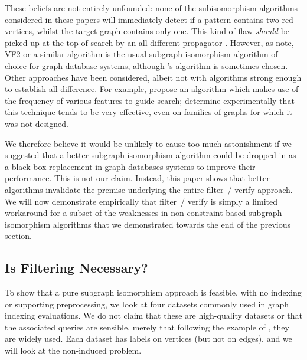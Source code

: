 \documentclass[twoside,11pt]{article}
\begin{document}
These beliefs are not entirely unfounded: none of the subisomorphism algorithms considered in these
papers will immediately detect if a pattern contains two red vertices, whilst the target graph
contains only one. This kind of flaw \emph{should} be picked up at the top of search by an
all-different propagator \cite{DBLP:conf/aaai/Regin94}.  However, as
 note, VF2 \cite{DBLP:journals/pami/CordellaFSV04} or a
similar algorithm is the usual subgraph isomorphism algorithm of choice for graph database systems,
although \citeauthor{DBLP:journals/jacm/Ullmann76}'s algorithm is sometimes chosen. Other approaches
have been considered, albeit not with algorithms strong enough to establish all-difference. For
example,  propose an algorithm which makes use of the
frequency of various features to guide search;  determine
experimentally that this technique tends to be very effective, even on families of graphs for which
it was not designed.

We therefore believe it would be unlikely to cause too much astonishment if we suggested that a
better subgraph isomorphism algorithm could be dropped in as a black box replacement in graph
databases systems to improve their performance.  This is not our claim. Instead, this paper shows
that better algorithms invalidate the premise underlying the entire filter~/ verify approach.  We
will now demonstrate empirically that filter~/ verify is simply a limited workaround for a subset of
the weaknesses in non-constraint-based subgraph isomorphism algorithms that we demonstrated towards
the end of the previous section.

\subsection{Is Filtering Necessary?}

To show that a pure subgraph isomorphism approach is feasible, with no indexing or supporting
preprocessing, we look at four datasets commonly used in graph indexing evaluations. We do not claim
that these are high-quality datasets or that the associated queries are sensible, merely that
following the example of , they are widely used. Each dataset
has labels on vertices (but not on edges), and we will look at the non-induced problem.
\end{document}
